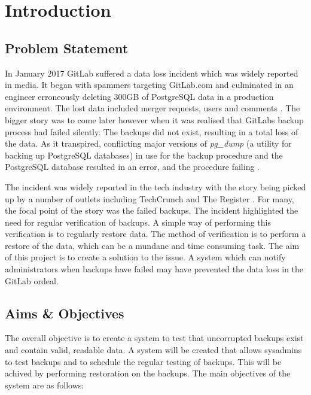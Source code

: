 \section{Introduction}

\subsection{Problem Statement}
In January 2017 GitLab suffered a data loss incident which was widely reported in media. It began with spammers targeting GitLab.com and culminated in an engineer erroneously deleting 300GB of PostgreSQL data in a production environment. The lost data included merger requests, users and comments \citep{gitlab1}. The bigger story was to come later however when it was realised that GitLabs backup process had failed silently. The backups did not exist, resulting in a total loss of the data. As it transpired, conflicting major versions of \textit{pg\_dump} (a utility for backing up PostgreSQL databases) in use for the backup procedure and the PostgreSQL database resulted in an error, and the procedure failing \citep{gitlab2}.

The incident was widely reported in the tech industry with the story being picked up by a number of outlets including TechCrunch \citeyearpar{lomas} and The Register \citeyearpar{sharwood}. For many, the focal point of the story was the failed backups. The incident highlighted the need for regular verification of backups. A simple way of performing this verification is to regularly restore data. The method of verification is to perform a restore of the data, which can be a mundane and time consuming task. The aim of this project is to create a solution to the issue. A system which can notify administrators when backups have failed may have prevented the data loss in the GitLab ordeal.

\subsection{Aims \& Objectives}
The overall objective is to create a system to test that uncorrupted backups exist and contain valid, readable data. A system will be created that allows sysadmins to test backups and to schedule the regular testing of backups. This will be achived by performing restoration on the backups. The main objectives of the system are as follows:


